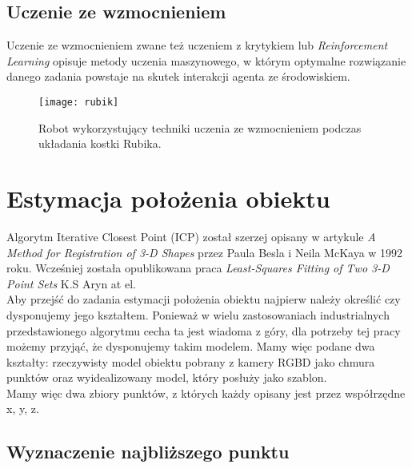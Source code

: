 \documentclass[12pt]{article}
\begin{document}
\subsection{Uczenie ze wzmocnieniem}
Uczenie ze wzmocnieniem zwane też uczeniem z krytykiem lub \emph{Reinforcement Learning} opisuje metody uczenia maszynowego, w którym optymalne rozwiązanie danego zadania powstaje na skutek interakcji agenta ze środowiskiem.

\begin{figure}[h]
\centering
\texttt{[image: rubik]}
\caption{Robot wykorzystujący techniki uczenia ze wzmocnieniem podczas układania kostki Rubika.}
\end{figure}

\newpage
\section{Estymacja położenia obiektu}
Algorytm Iterative Closest Point (ICP) został szerzej opisany w artykule \emph{A Method for Registration of 3-D Shapes} przez Paula Besla i Neila McKaya w 1992 roku. Wcześniej została opublikowana praca \emph{Least-Squares Fitting of Two 3-D Point Sets} K.S Aryn at el. 
\\
Aby przejść do zadania estymacji położenia obiektu najpierw należy określić czy dysponujemy jego kształtem. Ponieważ w wielu zastosowaniach industrialnych przedstawionego algorytmu cecha ta jest wiadoma z góry, dla potrzeby tej pracy możemy przyjąć, że dysponujemy takim modelem. Mamy więc podane dwa kształty: rzeczywisty model obiektu pobrany z kamery RGBD jako chmura punktów oraz wyidealizowany model, który posłuży jako szablon.
\\
Mamy więc dwa zbiory punktów, z których każdy opisany jest przez współrzędne x, y, z.
\\
\subsection{Wyznaczenie najbliższego punktu}
\end{document}
